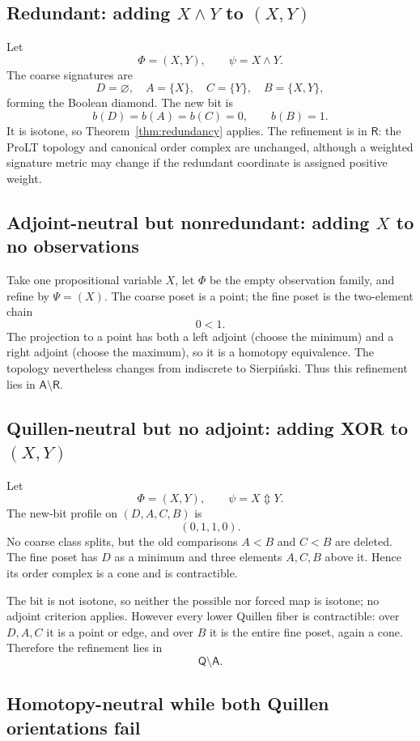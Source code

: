 \documentclass[11pt]{article}
\theoremstyle{definition}
\newcommand{\xor}{\mathbin{\Updownarrow}}
\begin{document}
\subsection{Redundant: adding \(X\wedge Y\) to \((X,Y)\)}

Let
\[
\Phi=(X,Y),\qquad \psi=X\wedge Y.
\]
The coarse signatures are
\[
D=\varnothing,
\quad A=\{X\},
\quad C=\{Y\},
\quad B=\{X,Y\},
\]
forming the Boolean diamond. The new bit is
\[
b(D)=b(A)=b(C)=0,
\qquad b(B)=1.
\]
It is isotone, so Theorem~\ref{thm:redundancy} applies. The refinement is in \(\mathsf R\): the ProLT topology and canonical order complex are unchanged, although a weighted signature metric may change if the redundant coordinate is assigned positive weight.

\subsection{Adjoint-neutral but nonredundant: adding \(X\) to no observations}

Take one propositional variable \(X\), let \(\Phi\) be the empty observation family, and refine by \(\Psi=(X)\). The coarse poset is a point; the fine poset is the two-element chain
\[
0<1.
\]
The projection to a point has both a left adjoint (choose the minimum) and a right adjoint (choose the maximum), so it is a homotopy equivalence. The topology nevertheless changes from indiscrete to Sierpi\'nski. Thus this refinement lies in \(\mathsf A\setminus\mathsf R\).

\subsection{Quillen-neutral but no adjoint: adding XOR to \((X,Y)\)}

Let
\[
\Phi=(X,Y),\qquad \psi=X\xor Y.
\]
The new-bit profile on \((D,A,C,B)\) is
\[
(0,1,1,0).
\]
No coarse class splits, but the old comparisons \(A<B\) and \(C<B\) are deleted. The fine poset has \(D\) as a minimum and three elements \(A,C,B\) above it. Hence its order complex is a cone and is contractible.

The bit is not isotone, so neither the possible nor forced map is isotone; no adjoint criterion applies. However every lower Quillen fiber is contractible: over \(D,A,C\) it is a point or edge, and over \(B\) it is the entire fine poset, again a cone. Therefore the refinement lies in
\[
\mathsf Q\setminus\mathsf A.
\]

\subsection{Homotopy-neutral while both Quillen orientations fail}\label{ex:alternating}
\end{document}
